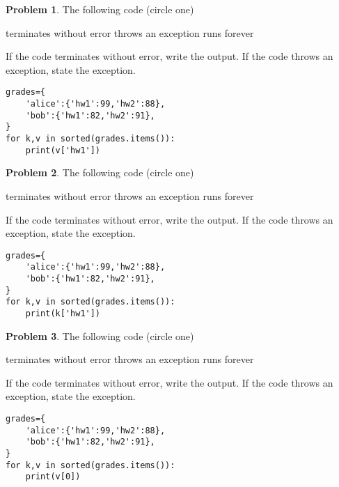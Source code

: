 \documentclass[10pt]{article}
\theoremstyle{definition}
\newtheorem{problem}{Problem}
\begin{document}
\newpage
\begin{problem}
    The following code (circle one)

    \vspace{0.25in}
    \hspace{0.5in}terminates without error 
    \hspace{1in}throws an exception
    \hspace{1in}runs forever
    \vspace{0.25in}

    \noindent
    If the code terminates without error, write the output.
    If the code throws an exception, state the exception.
\end{problem}
\begin{lstlisting}
grades={
    'alice':{'hw1':99,'hw2':88},
    'bob':{'hw1':82,'hw2':91},
}
for k,v in sorted(grades.items()):
    print(v['hw1'])
\end{lstlisting}
\vspace{0.75in}


\begin{problem}
    The following code (circle one)

    \vspace{0.25in}
    \hspace{0.5in}terminates without error 
    \hspace{1in}throws an exception
    \hspace{1in}runs forever
    \vspace{0.25in}

    \noindent
    If the code terminates without error, write the output.
    If the code throws an exception, state the exception.
\end{problem}
\begin{lstlisting}
grades={
    'alice':{'hw1':99,'hw2':88},
    'bob':{'hw1':82,'hw2':91},
}
for k,v in sorted(grades.items()):
    print(k['hw1'])
\end{lstlisting}
\vspace{0.75in}

\begin{problem}
    The following code (circle one)

    \vspace{0.25in}
    \hspace{0.5in}terminates without error 
    \hspace{1in}throws an exception
    \hspace{1in}runs forever
    \vspace{0.25in}

    \noindent
    If the code terminates without error, write the output.
    If the code throws an exception, state the exception.
\end{problem}
\begin{lstlisting}
grades={
    'alice':{'hw1':99,'hw2':88},
    'bob':{'hw1':82,'hw2':91},
}
for k,v in sorted(grades.items()):
    print(v[0])
\end{lstlisting}
\vspace{0.75in}
\end{document}
